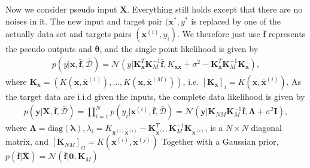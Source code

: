 \documentclass[10pt,a4paper]{article}
\begin{document}
Now we consider pseudo input $\bar{\pmb{X}}$. Everything still holds except that there are no noises in it. The new input and target pair $(\pmb{x}^*,y^*$ is replaced by one of the actually data set and targets pairs $(\pmb{x}^{(i)},y_i)$. We therefore just use $\bar{\pmb{f}}$ represents the pseudo outputs and $\bar{\pmb{\theta}}$, and the single point likelihood is given by
\begin{align}
p(y|\pmb{x},\bar{\pmb{f}},\bar{\mathcal{D}})=\mathcal{N}(y|\pmb{K}_{\pmb{x}}^T\pmb{K}_M^{-1}\bar{\pmb{f}},K_{\pmb{x}\pmb{x}}+\sigma^2-\pmb{K}_{\pmb{x}}^T\pmb{K}_M^{-1}\pmb{K}_{\pmb{x}}),
\end{align}
where $\pmb{K}_{\pmb{x}}=(K(\pmb{x},\bar{\pmb{x}}^{(1)}),\dots,K(\pmb{x},\bar{\pmb{x}}^{(M)}))$, i.e. $[\pmb{K}_{\pmb{x}}]_{i}=K(\pmb{x},\bar{\pmb{x}}^{(i)})$.
As the target data are i.i.d given the inputs, the complete data likelihood is given by
\begin{align}
p(\pmb{y}|\pmb{X},\bar{\pmb{f}},\bar{\mathcal{D}})=\prod^N_{i=1}p(y_i|\pmb{x}^{(i)},\bar{\pmb{f}},\bar{\mathcal{D}})=\mathcal{N}(\pmb{y}|\pmb{K}_{NM}\pmb{K}_M^{-1}\bar{\pmb{f}}, \pmb{\Lambda}+\sigma^2\pmb{I}),
\end{align}
where $\pmb{\Lambda}=\text{diag}(\pmb{\lambda}),\lambda_i = K_{\pmb{x}^{(i)}\pmb{x}^{(i)}}-\pmb{K}_{\pmb{x}^{(i)}}^T\pmb{K}_M^{-1}\pmb{K}_{\pmb{x}^{(i)}}$, is a $N\times N$ diagonal matrix, and $[\pmb{K}_{NM}]_{ij}=K(\pmb{x}^{(i)},\pmb{x}^{(j)})$
Together with a Gaussian prior, $p(\bar{\pmb{f}}|\bar{\pmb{X}})=\mathcal{N}(\bar{\pmb{f}}|\pmb{0},\pmb{K}_M)$
\end{document}
